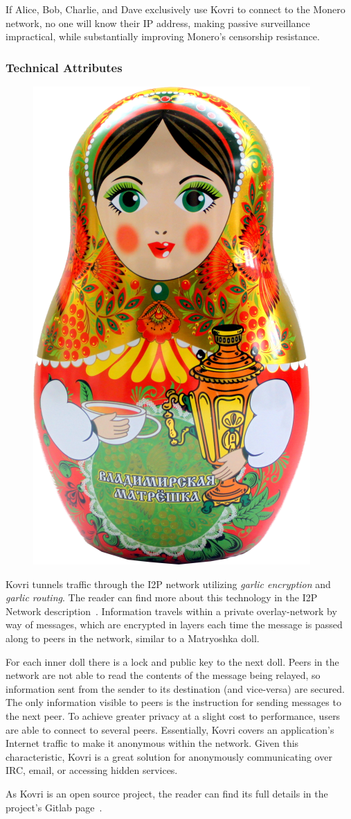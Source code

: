 If Alice, Bob, Charlie, and Dave exclusively use Kovri to connect to the Monero network, no one will know their IP address, making passive surveillance impractical, while substantially improving Monero's censorship resistance.

\subsubsection{Technical Attributes}
\begin{figure}
\centering
\includegraphics[height=0.30\textwidth]{Images/Kovri/doll.png}
\end{figure}
Kovri tunnels traffic through the I2P network utilizing \emph{garlic encryption} and \emph{garlic routing}. The reader can find more about this technology in the I2P Network description~\cite{i2p}. Information travels within a private overlay-network by way of messages, which are encrypted in layers each time the message is passed along to peers in the network, similar to a Matryoshka doll.

For each inner doll there is a lock and public key to the next doll. Peers in the network are not able to read the contents of the message being relayed, so information sent from the sender to its destination (and vice-versa) are secured. The only information visible to peers is the instruction for sending messages to the next peer. To achieve greater privacy at a slight cost to performance, users are able to connect to several peers. Essentially, Kovri covers an application's Internet traffic to make it anonymous within the network. Given this characteristic, Kovri is a great solution for anonymously communicating over IRC, email, or accessing hidden services.

As Kovri is an open source project, the reader can find its full details in the project's Gitlab page~\cite{git_kovri}.
